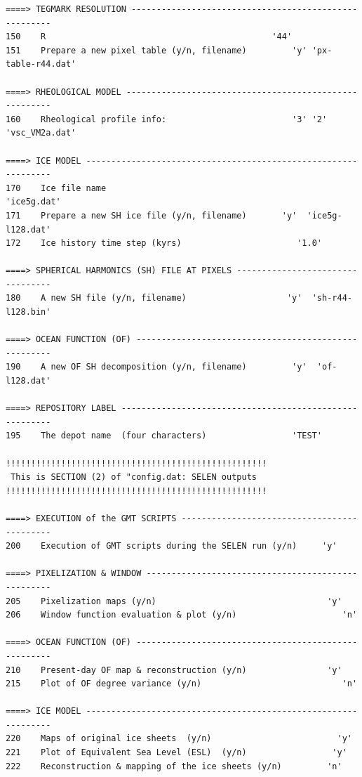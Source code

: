 \documentclass[11pt,fleqn,a4paper,titlepage]{article}
\begin{document}
{{\begin{verbatim}
====> TEGMARK RESOLUTION ------------------------------------------------------
150    R                  				             '44'
151    Prepare a new pixel table (y/n, filename)         'y' 'px-table-r44.dat'

====> RHEOLOGICAL MODEL -------------------------------------------------------
160    Rheological profile info:                         '3' '2' 'vsc_VM2a.dat'  

====> ICE MODEL ---------------------------------------------------------------
170    Ice file name                                               'ice5g.dat'  
171    Prepare a new SH ice file (y/n, filename)       'y'  'ice5g-l128.dat'
172    Ice history time step (kyrs)                       '1.0' 

====> SPHERICAL HARMONICS (SH) FILE AT PIXELS ---------------------------------
180    A new SH file (y/n, filename)                    'y'  'sh-r44-l128.bin'  

====> OCEAN FUNCTION (OF) -----------------------------------------------------
190    A new OF SH decomposition (y/n, filename)         'y'  'of-l128.dat'

====> REPOSITORY LABEL --------------------------------------------------------
195    The depot name  (four characters)                 'TEST' 

!!!!!!!!!!!!!!!!!!!!!!!!!!!!!!!!!!!!!!!!!!!!!!!!!!!!
 This is SECTION (2) of "config.dat: SELEN outputs
!!!!!!!!!!!!!!!!!!!!!!!!!!!!!!!!!!!!!!!!!!!!!!!!!!!!

====> EXECUTION of the GMT SCRIPTS -------------------------------------------- 
200    Execution of GMT scripts during the SELEN run (y/n)     'y'

====> PIXELIZATION & WINDOW ---------------------------------------------------
205    Pixelization maps (y/n)                                  'y'
206    Window function evaluation & plot (y/n)                     'n'

====> OCEAN FUNCTION (OF) -----------------------------------------------------
210    Present-day OF map & reconstruction (y/n)                'y'
215    Plot of OF degree variance (y/n)                            'n'

====> ICE MODEL ---------------------------------------------------------------
220    Maps of original ice sheets  (y/n)                	      'y' 
221    Plot of Equivalent Sea Level (ESL)  (y/n)       		     'y' 
222    Reconstruction & mapping of the ice sheets (y/n)  	    'n'


\end{verbatim}}}
\end{document}
